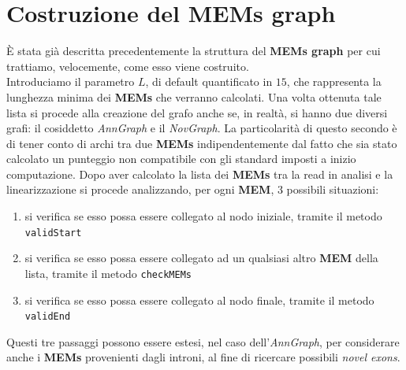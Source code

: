 \documentclass[a4paper,12pt, oneside]{book}
\begin{document}
\section{Costruzione del MEMs graph}
È stata già descritta precedentemente la struttura del \textbf{MEMs graph} per
cui trattiamo, velocemente, come esso viene costruito.\\
Introduciamo il parametro $L$, di default quantificato in $15$, che rappresenta
la lunghezza minima dei \textbf{MEMs} che verranno calcolati. Una volta ottenuta
tale lista si procede alla creazione del grafo anche se, in realtà, si hanno due
diversi grafi: il cosiddetto \textit{AnnGraph} e il 
\textit{NovGraph}. La particolarità di questo secondo è di tener conto di archi
tra due \textbf{MEMs} indipendentemente dal fatto che sia stato calcolato un
punteggio non compatibile con gli standard imposti a inizio computazione. Dopo
aver calcolato la lista dei \textbf{MEMs} tra la read in analisi e la
linearizzazione si procede analizzando, per ogni \textbf{MEM}, 3 possibili
situazioni:
\begin{enumerate}
  \item si verifica se esso possa essere collegato al nodo iniziale, tramite il
  metodo \texttt{validStart}
  \item si verifica se esso possa essere collegato ad un qualsiasi altro
  \textbf{MEM} della lista, tramite il metodo \texttt{checkMEMs}
  \item si verifica se esso possa essere collegato al nodo finale, tramite il
  metodo \texttt{validEnd} 
\end{enumerate}
Questi tre passaggi possono essere estesi, nel caso dell'\textit{AnnGraph}, per
considerare anche i \textbf{MEMs} provenienti dagli introni, al fine di
ricercare possibili \textit{novel exons}.
\end{document}
